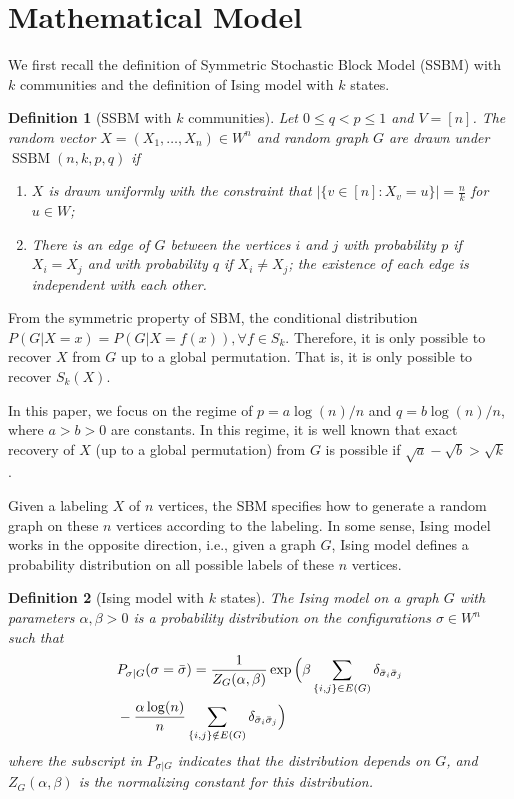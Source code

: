 \documentclass[conference]{IEEEtran}
\newtheorem{definition}{Definition}%
\DeclareMathOperator{\SSBM}{SSBM}
\newcommand{\ide}[2]{ \delta_{#1 #2} }
\begin{document}
	\section{Mathematical Model} \label{s:Preliminaries}
	We first recall the definition of Symmetric Stochastic Block Model (SSBM) with $k$ communities \cite{Abbe17} and the definition of Ising model with $k$ states.
	\begin{definition}[SSBM with $k$ communities] \label{def:SSBM}
		Let $0\leq q<p\leq 1$ and $V=[n]$. The random vector $X=(X_1,\dots,X_n)\in W^n$ and random graph $G$ are drawn under $\SSBM(n,k,p,q)$ if
		\begin{enumerate}
			\item $X$ is drawn uniformly with the constraint that $|\{v \in [n] : X_v = u\}| = \frac{n}{k}$ for $u\in W$;
			
			\item There is an edge of $G$ between the vertices $i$ and $j$ with probability $p$ if $X_i=X_j$ and with probability $q$ if $X_i \neq X_j$; the existence of each edge is independent with each other.
		\end{enumerate}
	\end{definition}
	From the symmetric property of SBM, the conditional distribution $P(G|X=x) = P(G|X=f(x)), \forall f \in S_k$. Therefore, it is only possible to recover $X$ from $G$ up to a global permutation. That is, it is only possible to recover $S_k(X)$.
	
	In this paper, we focus on the regime of $p=a\log(n)/n$ and $q=b\log(n)/n$, where $a>b> 0$ are constants. In this regime, it is well known that exact recovery of $X$ (up to a global permutation) from $G$ is possible if $\sqrt{a}-\sqrt{b} > \sqrt{k}$ \cite{abbe2015community}.
	
	Given a labeling $X$ of $n$ vertices, the SBM specifies how to generate a random graph on these $n$ vertices according to the labeling. In some sense, Ising model works in the opposite direction, i.e., given a graph $G$, Ising model defines a probability distribution on all possible labels of these $n$ vertices. 
	
	
	\begin{definition}[Ising model with $k$ states]
		The Ising model on a graph $G$ with parameters $\alpha,\beta>0$ is a probability distribution on the configurations $\sigma\in W^n$ such that
		\begin{align} \label{eq:isingma}
		&P_{\sigma|G}(\sigma=\bar{\sigma})=\frac{1}{Z_G(\alpha,\beta)}
		\exp\Big(\beta \sum_{\{i,j\}\in E(G)} \ide{\bar{\sigma}_i}{\bar{\sigma}_j}\notag\\
		&-\frac{\alpha\log(n)}{n} \sum_{\{i,j\}\notin E(G)} \ide{\bar{\sigma}_i}{\bar{\sigma}_j}
		\Big)
		\end{align}
		where the subscript in $P_{\sigma|G}$ indicates that the distribution depends on $G$, and
		$Z_G(\alpha,\beta)$ is the normalizing constant for this distribution.
	\end{definition}
	
\end{document}
